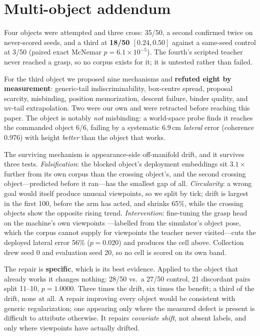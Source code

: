 \documentclass[10pt,twocolumn,letterpaper]{article}
\begin{document}
\section{Multi-object addendum}

Four objects were attempted and three cross: 35/50, a second confirmed twice on
never-scored seeds, and a third at \textbf{18/50 $[0.24,0.50]$} against a
same-seed control at 3/50 (paired exact McNemar $p{=}6.1\times10^{-5}$). The
fourth's scripted teacher never reached a grasp, so no corpus exists for it; it
is untested rather than failed.

For the third object we proposed nine mechanisms and \textbf{refuted eight by
measurement}: generic-tail indiscriminability, box-centre spread, proposal
scarcity, misbinding, position memorization, descent failure, binder quality,
and uv-tail extrapolation. Two were our own and were retracted before reaching
this paper. The object is notably \emph{not} misbinding: a world-space probe
finds it reaches the commanded object 6/6, failing by a systematic 6.9\,cm
\emph{lateral} error (coherence 0.976) with height \emph{better} than the
object that works.

The surviving mechanism is appearance-side off-manifold drift, and it survives
three tests. \emph{Falsification}: the blocked object's deployment embeddings
sit $3.1\times$ further from its own corpus than the crossing object's, and the
second crossing object---predicted before it ran---has the smallest gap of all.
\emph{Circularity}: a wrong goal would itself produce unusual viewpoints, so we
split by tick; drift is largest in the first 100, before the arm has acted, and
shrinks 65\%, while the crossing objects show the opposite rising trend.
\emph{Intervention}: fine-tuning the grasp head on the machine's own viewpoints
---labelled from the simulator's object pose, which the corpus cannot supply
for viewpoints the teacher never visited---cuts the deployed lateral error
56\% ($p{=}0.020$) and produces the cell above. Collection drew seed 0 and
evaluation seed 20, so no cell is scored on its own band.

The repair is \textbf{specific}, which is its best evidence. Applied to the
object that already works it changes nothing: 28/50 vs.\ a 27/50 control, 21
discordant pairs split 11--10, $p{=}1.0000$. Three times the drift, six times
the benefit; a third of the drift, none at all. A repair improving every object
would be consistent with generic regularization; one appearing only where the
measured defect is present is difficult to attribute otherwise. It repairs
\emph{covariate shift}, not absent labels, and only where viewpoints have
actually drifted.
\end{document}
